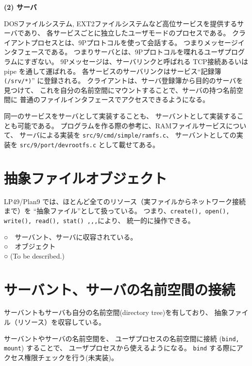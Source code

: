 {\bf\flushleft (2) サーバ}

    DOSファイルシステム, EXT2ファイルシステムなど高位サービスを提供するサーバであり、
    各サービスごとに独立したユーザモードのプロセスである。
    クライアントプロセスとは、9Pプロトコルを使って会話する。
    つまりメッセージインタフェースである。
    つまりサーバとは、9Pプロトコルを喋れるユーザプログラムにすぎない。
    9Pメッセージは、サーバリンクと呼ばれる TCP接続あるいは pipe を通して運ばれる。
   各サービスのサーバリンクはサービス``記録簿 {\tt (/srv/*)}'' に登録される。
   クライアントは、サーバ登録簿から目的のサーバを見つけて、
   これを自分の名前空間にマウントすることで、サーバの持つ名前空間に
   普通のファイルインタフェースでアクセスできるようになる。

   同一のサービスをサーバとして実装することも、
   サーバントとして実装することも可能である。
   プログラムを作る際の参考に、RAMファイルサービスについて、
   サーバによる実装を {\tt src/9/cmd/simple/ramfs.c}、
   サーバントとしての実装を {\tt src/9/port/devrootfs.c} として載せてある。 


\section{抽象ファイルオブジェクト}

LP49/Plan9 では、ほとんど全てのリソース（実ファイルからネットワーク接続まで）を
``抽象ファイル''として扱っている。
つまり、{\tt create(), open(), write(), read(), stat() ,,,}により、
統一的に操作できる。


○　サーバント、サーバに収容されている。\\

○　オブジェクト \\

○  (To be described.) \\

\vspace{4cm}


\section{サーバント、サーバの名前空間の接続}

   サーバントもサーバも自分の名前空間(directory tree)を有しており、
抽象ファイル（リソース）を収容している。

   サーバントやサーバの名前空間を、
ユーザプロセスの名前空間に接続 ({\tt bind, mount}) することで、
ユーザプロセスから使えるようになる。
 {\tt bind} する際にアクセス権限チェックを行う(未実装)。

